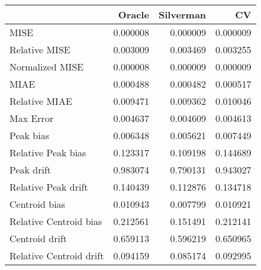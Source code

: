 \begin{tabular}{lrrr}
  \hline
 & Oracle & Silverman & CV \\ 
  \hline
MISE & 0.000008 & 0.000009 & 0.000009 \\ 
  Relative MISE & 0.003009 & 0.003469 & 0.003255 \\ 
  Normalized MISE & 0.000008 & 0.000009 & 0.000009 \\ 
  MIAE & 0.000488 & 0.000482 & 0.000517 \\ 
  Relative MIAE & 0.009471 & 0.009362 & 0.010046 \\ 
  Max Error & 0.004637 & 0.004609 & 0.004613 \\ 
  Peak bias & 0.006348 & 0.005621 & 0.007449 \\ 
  Relative Peak bias & 0.123317 & 0.109198 & 0.144689 \\ 
  Peak drift & 0.983074 & 0.790131 & 0.943027 \\ 
  Relative Peak drift & 0.140439 & 0.112876 & 0.134718 \\ 
  Centroid bias & 0.010943 & 0.007799 & 0.010921 \\ 
  Relative Centroid bias & 0.212561 & 0.151491 & 0.212141 \\ 
  Centroid drift & 0.659113 & 0.596219 & 0.650965 \\ 
  Relative Centroid drift & 0.094159 & 0.085174 & 0.092995 \\ 
   \hline
\end{tabular}
